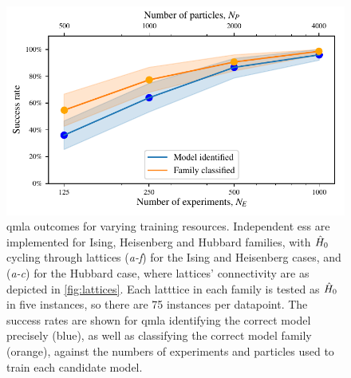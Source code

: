     \begin{figure}[t]
        \begin{center}
            \includegraphics{theoretical_study/figures/model_family_search.pdf}
        \end{center}
        \caption[QMLA outcomes for varying training resources]{
            \gls{qmla} outcomes for varying training resources. 
            Independent \glspl{es} are implemented for Ising, Heisenberg and Hubbard families, 
                with $\hat{H}_0$ cycling through lattices (\emph{a-f}) for the Ising and Heisenberg cases, 
                and (\emph{a-c}) for the Hubbard case, where lattices' connectivity are as depicted in \cref{fig:lattices}.
            Each latttice in each family is tested as $\hat{H}_0$ in five \glspl{instance}, so there are 75 \glspl{instance} per datapoint. 
            The success rates are shown for \gls{qmla} identifying the correct model precisely (blue),
                as well as classifying the correct model family (orange), 
                against the numbers of \glspl{experiment} and \glspl{particle} used to train each candidate model. 
            \figtableref
        }
        \label{fig:family_classification}
    \end{figure}
    